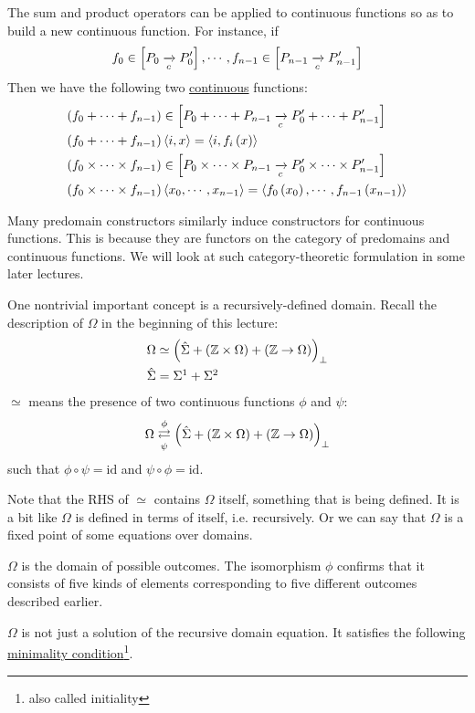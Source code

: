 \begin{enumcirc}
\begin{enumrm}
		\item
		The sum and product operators can be applied to continuous functions so as to
		build a new continuous function.
		For instance, if
		\[
			f_0 \in \left[ P_0 \xrightarrow[c]{} P_0^\prime \right], \cdots, f_{n-1} \in \left[ P_{n-1} \xrightarrow[c]{} P_{n-1}^\prime \right]
		\]
		Then we have the following two \ul{continuous} functions:
		\begin{align*}
			\left( f_0 + \cdots + f_{n-1} \right)           & \in \left[ P_0 + \cdots + P_{n-1} \xrightarrow[c]{} P_0^\prime + \cdots + P_{n-1}^\prime \right]                     \\
			\left( f_0 + \cdots + f_{n-1} \right)           & \left\langle i, x \right\rangle  = \left\langle i, f_i\left( x \right) \right\rangle                                                       \\
			\left( f_0 \times \cdots \times f_{n-1} \right) & \in \left[ P_0 \times \cdots \times P_{n-1} \xrightarrow[c]{} P_0^\prime \times \cdots \times P_{n-1}^\prime \right] \\
			\left( f_0 \times \cdots \times f_{n-1} \right) & \left\langle x_0, \cdots, x_{n-1} \right\rangle = \left\langle f_0\left( x_0 \right), \cdots, f_{n-1}\left( x_{n-1} \right) \right\rangle
		\end{align*}
	\end{enumrm}
	Many predomain constructors similarly induce constructors for continuous
	functions.
	This is because they are functors on the category of predomains and continuous
	functions.
	We will look at such category-theoretic formulation in some later lectures.
	\item
	One nontrivial important concept is a recursively-defined domain.
	Recall the description of $\Omega$ in the beginning of this lecture:
	\begin{align*}
		\Omega       & \simeq \prths{\hat{\Sigma} + \prths{\Z \times \Omega} + \prths{\Z \to \Omega}}_\bot \\
		\hat{\Sigma} & = \Sigma\footnotemark + \Sigma\footnotemark
	\end{align*}
	$\simeq$ means the presence of two continuous functions $\phi$ and $\psi$:
	\[
		\Omega
		\mathrel{\mathop{\rightleftarrows}^{\mathrm{\phi}}_{\mathrm{\psi}}}
		\left( \hat{\Sigma} + \left( \mathbb{Z} \times \Omega \right) + \left( \mathbb{Z} \to \Omega \right) \right)_\bot
	\]
	such that $\phi \circ \psi = \mathrm{id}$ and $\psi \circ \phi = \mathrm{id}$.

	Note that the RHS of $\simeq$ contains $\Omega$ itself, something that is being
	defined.
	It is a bit like $\Omega$ is defined in terms of itself, i.e. recursively.
	Or we can say that $\Omega$ is a fixed point of some equations over domains.
	\begin{enumrm}
		\item
		$\Omega$ is the domain of possible outcomes.
		The isomorphism $\phi$ confirms that it consists of five kinds of elements
		corresponding to five different outcomes described earlier.
		\item
		$\Omega$ is not just a solution of the recursive domain equation.
		It satisfies the following \ul{minimality condition}\footnote{ also called
			initiality }.


\end{enumrm}
\end{enumcirc}
